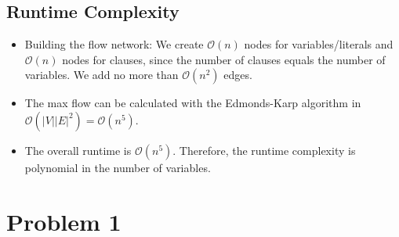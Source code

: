 \documentclass[12pt]{article}
\begin{document}
\subsection*{Runtime Complexity}
\begin{itemize}
	\item Building the flow network: We create $\mathcal{O}(n)$ nodes for variables/literals and $\mathcal{O}(n)$ nodes for clauses, since the number of clauses equals the number of variables. We add no more than $\mathcal{O}(n^2)$ edges.
	\item The max flow can be calculated with the Edmonds-Karp algorithm in $\mathcal{O}(|V| |E|^2) = \mathcal{O}(n^5)$.
	\item The overall runtime is $\mathcal{O}(n^5)$. Therefore, the runtime complexity is polynomial in the number of variables.
\end{itemize}

\section*{Problem 1}
\end{document}
